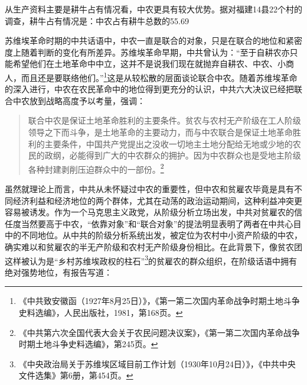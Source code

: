 从生产资料主要是耕牛占有情况看，中农更具有较大优势。据对福建14县22个村的调查，耕牛占有情况是：中农占有耕牛总数的55.69%


苏维埃革命时期的中共话语中，中农一直是联合的对象，只是在联合的地位和紧密度上随着判断的变化有所差异。苏维埃革命早期，中共曾认为：“至于自耕农亦只能希望他们在土地革命中中立，这并不是说我们现在就抛弃自耕农、中农、小商人，而且还是要联络他们。”\footnote{《中共致安徽函（1927年8月25日）》，《第一第二次国内革命战争时期土地斗争史料选编》，人民出版社，1981，第168页。}这是从较松散的层面谈论联合中农。随着苏维埃革命的深入进行，中农在农民革命中的地位得到更充分的认识，中共六大决议已经把联合中农放到战略高度予以考量，强调：

\begin{quote}

联合中农是保证土地革命胜利的主要条件。贫农与农村无产阶级在工人阶级领导之下而斗争，是土地革命的主要动力，而与中农联合是保证土地革命胜利的主要条件，中国共产党提出之没收一切地主土地分配给无地或少地的农民的政纲，必能得到广大的中农群众的拥护。因为中农群众也是受地主阶级各种封建剥削压迫群众中的一部份。\footnote{《中共第六次全国代表大会关于农民问题决议案》，《第一第二次国内革命战争时期土地斗争史料选编》，第245页。}
\end{quote}


虽然就理论上而言，中共从未怀疑过中农的重要性，但中农和贫雇农毕竟是具有不同经济利益和经济地位的两个群体，尤其在动荡的政治运动期间，这种利益冲突更容易被诱发。作为一个马克思主义政党，从阶级分析立场出发，中共对贫雇农的信任度当然要高于中农，“依靠对象”和“联合对象”的提法明显表明了两者在中共心目中的不同地位。从中共的阶级分析系统出发，被定位为农村中小资产阶级的中农，确实难以和贫雇农的半无产阶级和农村无产阶级身份相比。在此背景下，像贫农团这样被认为是“乡村苏维埃政权的柱石”\footnote{《中央政治局关于苏维埃区域目前工作计划（1930年10月24日）》，《中共中央文件选集》第6册，第454页。}的贫雇农的群众组织，在阶级话语中拥有绝对强势地位，有报告写道：

